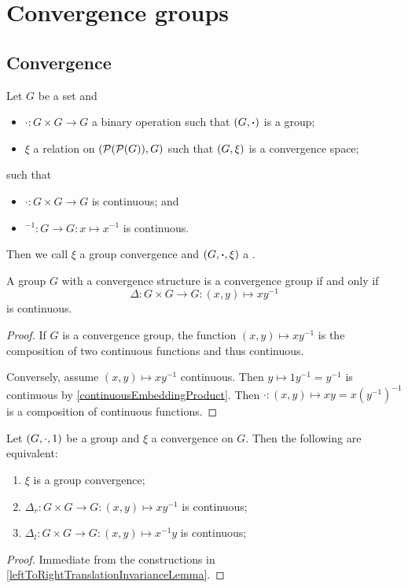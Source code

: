\chapter{Convergence groups}
\section{Convergence}
\begin{definition}
Let $G$ be a set and
\begin{itemize}
\item $\boldsymbol{\cdot}: G\times G \to G$ a binary operation such that $\left( G, \boldsymbol{\cdot} \right)$ is a group;
\item $\xi$ a relation on $(\operatorname{\mathcal{P}}(\operatorname{\mathcal{P}}(G)), G)$ such that $\left( G, \xi \right)$ is a convergence space;
\end{itemize}
such that
\begin{itemize}
\item $\boldsymbol{\cdot}: G\times G \to G$ is continuous; and
\item $^{-1}: G\to G: x\mapsto x^{-1}$ is continuous.
\end{itemize}
Then we call $\xi$ a group convergence and $\left( G, \boldsymbol{\cdot}, \xi \right)$ a .
\end{definition}

\begin{lemma} \label{convergenceGroupCriterion}
A group $G$ with a convergence structure is a convergence group \textup{if and only if}
\[ \Delta: G\times G \to G: (x,y) \mapsto xy^{-1} \]
is continuous.
\end{lemma}
\begin{proof}
If $G$ is a convergence group, the function $(x,y) \mapsto xy^{-1}$ is the composition of two continuous functions and thus continuous.

Conversely, assume $(x,y) \mapsto xy^{-1}$ continuous. Then $y \mapsto 1y^{-1} = y^{-1}$ is continuous by \ref{continuousEmbeddingProduct}. Then $\boldsymbol{\cdot}: (x,y) \mapsto xy = x(y^{-1})^{-1}$ is a composition of continuous functions.
\end{proof}

\begin{lemma} \label{groupConvergenceIffDeltasContinuous}
Let $\left( G,\cdot, 1 \right)$ be a group and $\xi$ a convergence on $G$. Then the following are equivalent:
\begin{enumerate}
\item $\xi$ is a group convergence;
\item $\Delta_r: G\times G \to G: (x,y) \mapsto xy^{-1}$ is continuous;
\item $\Delta_l: G\times G \to G: (x,y) \mapsto x^{-1}y$ is continuous;
\end{enumerate}
\end{lemma}
\begin{proof}
Immediate from the constructions in \ref{leftToRightTranslationInvarianceLemma}.
\end{proof}

